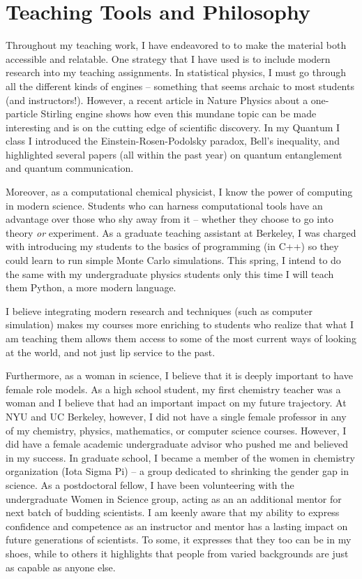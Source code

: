 \documentclass[11pt]{article}
\begin{document}
\section{Teaching Tools and Philosophy}

Throughout my teaching work, I have endeavored to to make the material both accessible and relatable.  One strategy that I have used is to include modern research into my teaching assignments.  In statistical physics, I must go through all the different kinds of engines -- something that seems archaic to most students (and instructors!).  However, a recent article in Nature Physics about a one-particle Stirling engine shows how even this mundane topic can be made interesting and is on the cutting edge of scientific discovery.  In my Quantum I class I introduced the Einstein-Rosen-Podolsky paradox, Bell's inequality, and highlighted several papers (all within the past year) on quantum entanglement and quantum communication.

Moreover, as a computational chemical physicist, I know the power of computing in modern science.  Students who can harness computational tools have an advantage over those who shy away from it  -- whether they choose to go into theory \textit{or} experiment.  As a graduate teaching assistant at Berkeley, I was charged with introducing my students to the basics of programming (in C++) so they could learn to run simple Monte Carlo simulations.  This spring, I intend to do the same with my undergraduate physics students only this time I will teach them Python, a more modern language.

I believe integrating modern research and techniques (such as computer simulation) makes my courses more enriching to students who realize that what I am teaching them allows them access to some of the most current ways of looking at the world, and not just lip service to the past.

Furthermore, as a woman in science, I believe that it is deeply important to have female role models.  As a high school student, my first chemistry teacher was a woman and I believe that had an important impact on my future trajectory.  At NYU and UC Berkeley, however, I did not have a single female professor in any of my chemistry, physics, mathematics, or computer science courses.  However, I did have a female academic undergraduate advisor who pushed me and believed in my success.  In graduate school, I became a member of the women in chemistry organization (Iota Sigma Pi) -- a group dedicated to shrinking the gender gap in science.  As a postdoctoral fellow, I have been volunteering with the undergraduate Women in Science group, acting as an an additional mentor for next batch of budding scientists.  I am keenly aware that my ability to express confidence and competence as an instructor and mentor has a lasting impact on future generations of scientists.  To some, it expresses that they too can be in my shoes, while to others it highlights that people from varied backgrounds are just as capable as anyone else.
\end{document}
